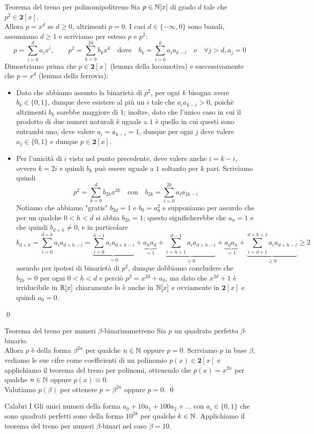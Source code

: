 \documentclass{article}
\begin{document}
\begin{theorem}{Teorema del treno per polinomi}{politreno}
    Sia $p \in \mathbb{N}[x]$ di grado $d$ tale che $p^2 \in \mathbf{2}[x]$.\\
    Allora $p = x^d$ se $d\ge 0$, altrimenti $p=0$.
    \proof 
    I casi $d\in\{-\infty, 0\}$ sono banali, assumiamo $d\ge 1$ e scriviamo per esteso $p$ e $p^2$:
    \[p = \sum_{i=0}^d a_i x^i, \qquad p^2 = \sum_{k=0}^{2d} b_k x^k \quad\text{dove}\quad b_k = \sum_{i=0}^k a_i a_{k-i} \quad\text{e}\quad \forall j > d, a_j=0\]
    Dimostriamo prima che $p \in \mathbf{2}[x]$ (lemma della locomotiva) e successivamente che $p = x^d$ (lemma della ferrovia):\begin{itemize}
        \item Dato che abbiamo assunto la binarietà di $p^2$, per ogni $k$ bisogna avere $b_k \in\{0,1\}$, dunque deve esistere al più un $i$ tale che $a_i a_{k-i} > 0$, poichè altrimenti $b_k$ sarebbe maggiore di $1$; inoltre, dato che l'unico caso in cui il prodotto di due numeri naturali è uguale a $1$ è quello in cui questi sono entrambi uno, deve valere $a_i = a_{k-i} = 1$, dunque per ogni $j$ deve valere $a_j \in \{0,1\}$ e dunque $p \in \mathbf{2}[x]$.
        \item Per l'unicità di $i$ vista nel punto precedente, deve valere anche $i = k-i$, ovvero $k = 2i$ e quindi $b_k$ può essere uguale a $1$ soltanto per $k$ pari. Scriviamo quindi
        \[ p^2 = \sum_{k=0}^d b_{2k} x^{2k} \quad \text{con}\quad b_{2k} = \sum_{i=0}^{2k}a_{i}a_{2k-i} \]
        Notiamo che abbiamo "gratis" $b_{2d} = 1$ e $b_0 = a_0^2$ e supponiamo per assurdo che per un qualche $0<h<d$ si abbia $b_{2h}=1$; questo significherebbe che $a_{h}=1$ e che quindi $b_{d+h}\neq 0$, e in particolare
        \[ b_{d+h} = \sum_{i=0}^{d+h} a_i a_{d+h-i} = \underbrace{\sum_{i=0}^{h-1} a_ia_{d+h-i}}_{=0} + \underbrace{a_{h}a_{d}}_{=1} + \underbrace{\sum_{i = h+1}^{d-1} a_{i} a_{d+h-i} }_{\ge 0} + \underbrace{a_{d}a_{h}}_{=1} + \underbrace{\sum_{i=d+1}^{d+h+1}a_i a_{d+h-i}}_{\ge 0}\ge 2\]
        assurdo per ipotesi di binarietà di $p^2$, dunque dobbiamo concludere che $b_{2h} = 0$ per ogni $0<h<d$ e perciò $p^2 = x^{2d} + a_0$, ma dato che $x^{2d} +1$ è irriducibile in $\mathbb{R}[x]$ chiaramente lo è anche in $\mathbb{N}[x]$ e ovviamente in $\mathbf{2}[x]$ e quindi $a_0 = 0$.
    \end{itemize}
    \qed
\end{theorem}

\begin{corollary}{Teorema del treno per numeri $\beta$-binari}{numetreno}
    Sia $p$ un quadrato perfetto $\beta$-binario.\\ 
    Allora $p$ è della forma $\beta^{2n}$ per qualche $n\in \mathbb{N}$ oppure $p=0$.
    \proof 
    Scriviamo $p$ in base $\beta$, vediamo le sue cifre come coefficienti di un polinomio $p(x) \in \mathbf{2}[x]$ e applichiamo il teorema del treno per polinomi, ottenendo che $p(x) = x^{2n}$ per qualche $n \in \mathbb{N}$ oppure $p(x)\equiv 0$.\\
    Valutiamo $p(\beta)$ per ottenere $p = \beta^{2n}$ oppure $p = 0$.
    \qed
\end{corollary}

\begin{corollary}{Calabri I}{}
    Gli unici numeri della forma $a_0+10a_1+100a_2+...$ con $a_i \in \{0,1\}$ che sono quadrati perfetti sono della forma $10^{2k}$ per qualche $k \in \mathbb{N}$.
    \proof 
    Applichiamo il teorema del treno per numeri $\beta$-binari nel caso $\beta=10$.
\end{corollary}
\end{document}
